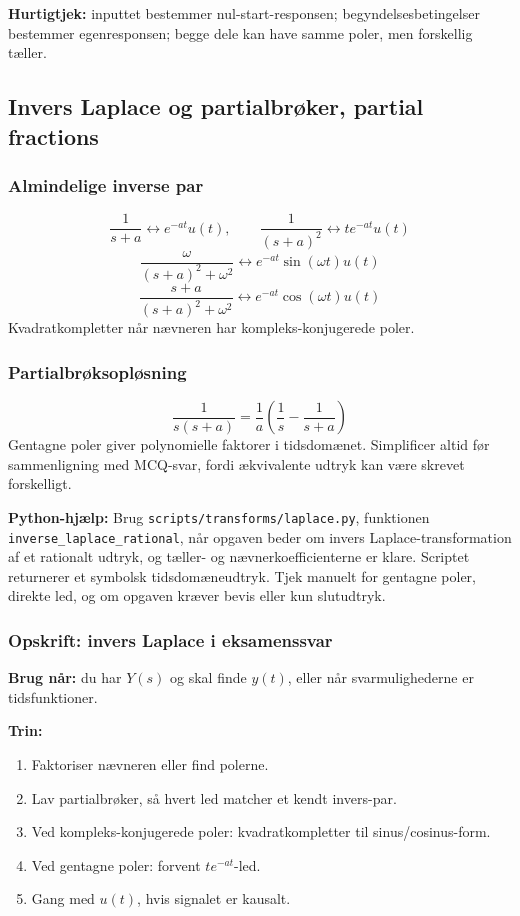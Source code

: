 \textbf{Hurtigtjek:} inputtet bestemmer nul-start-responsen; begyndelsesbetingelser bestemmer egenresponsen; begge dele kan have samme poler, men forskellig tæller.

\subsection{Invers Laplace og partialbrøker, partial fractions}

\subsubsection{Almindelige inverse par}
\[
\frac{1}{s+a}\leftrightarrow e^{-at}u(t),\qquad
\frac{1}{(s+a)^2}\leftrightarrow t e^{-at}u(t)
\]
\[
\frac{\omega}{(s+a)^2+\omega^2}\leftrightarrow e^{-at}\sin(\omega t)u(t)
\]
\[
\frac{s+a}{(s+a)^2+\omega^2}\leftrightarrow e^{-at}\cos(\omega t)u(t)
\]
Kvadratkompletter når nævneren har kompleks-konjugerede poler.

\subsubsection{Partialbrøksopløsning}
\[
\frac{1}{s(s+a)}=\frac{1}{a}\left(\frac{1}{s}-\frac{1}{s+a}\right)
\]
Gentagne poler giver polynomielle faktorer i tidsdomænet. Simplificer altid før sammenligning med MCQ-svar, fordi ækvivalente udtryk kan være skrevet forskelligt.

\textbf{Python-hjælp:} Brug \texttt{scripts/transforms/laplace.py}, funktionen \texttt{inverse\_laplace\_rational}, når opgaven beder om invers Laplace-transformation af et rationalt udtryk, og tæller- og nævnerkoefficienterne er klare. Scriptet returnerer et symbolsk tidsdomæneudtryk. Tjek manuelt for gentagne poler, direkte led, og om opgaven kræver bevis eller kun slutudtryk.

\subsubsection{Opskrift: invers Laplace i eksamenssvar}
\textbf{Brug når:} du har \(Y(s)\) og skal finde \(y(t)\), eller når svarmulighederne er tidsfunktioner.

\textbf{Trin:}
\begin{enumerate}
    \item Faktoriser nævneren eller find polerne.
    \item Lav partialbrøker, så hvert led matcher et kendt invers-par.
    \item Ved kompleks-konjugerede poler: kvadratkompletter til sinus/cosinus-form.
    \item Ved gentagne poler: forvent \(t e^{-at}\)-led.
    \item Gang med \(u(t)\), hvis signalet er kausalt.
\end{enumerate}

